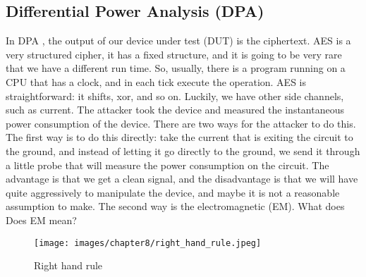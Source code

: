 \subsection{Differential Power Analysis (DPA)}\label{c8_prev_lectures_recap_dpa_sc:subsec}

In DPA \cite{kocher1999differential, kocher1998introduction}, the output of our device under test (DUT) is the ciphertext. AES is a
very structured cipher, it has a fixed structure, and it is going to be very rare
that we have a different run time. So, usually, there is a program running
on a CPU that has a clock, and in each tick execute the operation. AES is straightforward: it shifts, xor, and so on. Luckily, we have other side channels, such as
current. The attacker took the device and measured the instantaneous power
consumption of the device. There are two ways for the attacker to do this. The
first way is to do this directly: take the current that is exiting the circuit
to the ground, and instead of letting it go directly to the ground, we send it
through a little probe that will measure the power consumption on the circuit.
The advantage is that we get a clean signal, and the disadvantage is that we
will have quite aggressively to manipulate the device, and maybe it is not a
reasonable assumption to make. The second way is the electromagnetic (EM). What does
Does EM mean?

\begin{figure}[!ht]
    \centering
    \texttt{[image: images/chapter8/right\_hand\_rule.jpeg]}
    \caption{Right hand rule} \label{c8_right_hand_rule:fig}
\end{figure}

